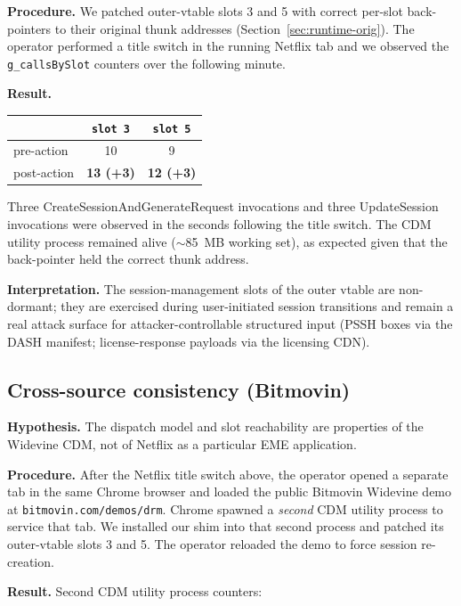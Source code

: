 \documentclass[11pt,letterpaper]{article}
\begin{document}
\textbf{Procedure.}  We patched outer-vtable slots 3 and 5 with
correct per-slot back-pointers to their original thunk addresses
(Section~\ref{sec:runtime-orig}).  The operator performed a title
switch in the running Netflix tab and we observed the
\texttt{g\_callsBySlot} counters over the following minute.

\textbf{Result.}

\begin{center}\small
\begin{tabular}{lcc}
\toprule
& \texttt{slot 3} & \texttt{slot 5} \\
\midrule
pre-action & 10 & 9 \\
post-action & \textbf{13 (+3)} & \textbf{12 (+3)} \\
\bottomrule
\end{tabular}
\end{center}

\noindent Three CreateSessionAndGenerateRequest invocations and three
UpdateSession invocations were observed in the seconds following the
title switch.  The CDM utility process remained alive
($\sim$85~MB working set), as expected given that the back-pointer
held the correct thunk address.

\textbf{Interpretation.}  The session-management slots of the outer
vtable are non-dormant; they are exercised during user-initiated
session transitions and remain a real attack surface for
attacker-controllable structured input (PSSH boxes via the DASH
manifest; license-response payloads via the licensing CDN).

\subsection{Cross-source consistency (Bitmovin)}
\label{sec:findings-cross}

\textbf{Hypothesis.}  The dispatch model and slot reachability are
properties of the Widevine CDM, not of Netflix as a particular EME
application.

\textbf{Procedure.}  After the Netflix title switch above, the
operator opened a separate tab in the same Chrome browser and loaded
the public Bitmovin Widevine demo at \texttt{bitmovin.com/demos/drm}.
Chrome spawned a \emph{second} CDM utility process to service that
tab.  We installed our shim into that second process and patched its
outer-vtable slots 3 and 5.  The operator reloaded the demo to force
session re-creation.

\textbf{Result.}  Second CDM utility process counters:
\end{document}
